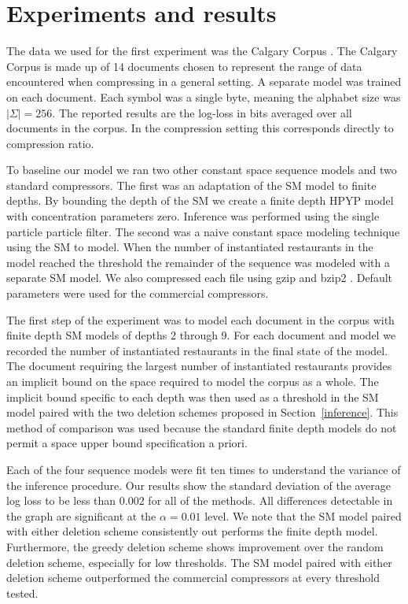 \section{Experiments and results}
\label{results}

The data we used for the first experiment was the Calgary Corpus \cite{Bell1989}.  The Calgary Corpus is made up of 14 documents chosen to represent the range of data encountered when compressing in a general setting. A separate model was trained on each document.  Each symbol was a single byte, meaning the alphabet size was $|\Sigma|=256$.  The reported results are the log-loss in bits averaged over all documents in the corpus.  In the compression setting this corresponds directly to compression ratio.


To baseline our model we ran two other constant space sequence models and two standard compressors.  The first was an adaptation of the SM model to finite depths.  By bounding the depth of the SM we create a finite depth HPYP model with concentration parameters zero.  Inference was performed using the single particle particle filter. The second was a naive constant space modeling technique using the SM to model.  When the number of instantiated restaurants in the model reached the threshold the remainder of the sequence was modeled with a separate SM model.  We also compressed each file using gzip and bzip2 \cite{Deutsch1996, Seward1999}.  Default parameters were used for the commercial compressors.

The first step of the experiment was to model each document in the corpus with finite depth SM models of depths 2 through 9.  For each document and model we recorded the number of instantiated restaurants in the final state of the model.  The document requiring the largest number of instantiated restaurants provides an implicit bound on the space required to model the corpus as a whole. The implicit bound specific to each depth was then used as a threshold in the SM model paired with the two deletion schemes proposed in Section~\ref{inference}. This method of comparison was used because the standard finite depth models do not permit a space upper bound specification a priori.

Each of the four sequence models were fit ten times to understand the variance of the inference procedure.  Our results show the standard deviation of the average log loss to be less than $0.002$ for all of the methods.  All differences detectable in the graph are significant at the $\alpha = 0.01$ level. We note that the SM model paired with either deletion scheme consistently out performs the finite depth model.  Furthermore, the greedy deletion scheme shows improvement over the random deletion scheme, especially for low thresholds.  The SM model paired with either deletion scheme outperformed the commercial compressors at every threshold tested.